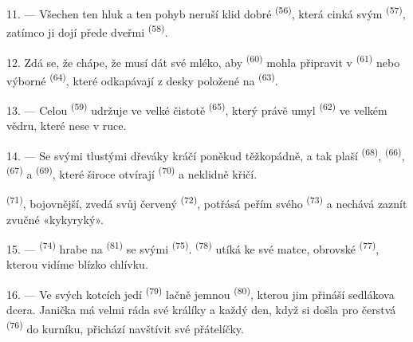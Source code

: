 11. --- Všechen ten hluk a ten pohyb neruší klid dobré 
\textsuperscript{(56)}, která cinká svým  \textsuperscript{(57)}, zatímco ji
dojí přede dveřmi  \textsuperscript{(58)}.

12. Zdá se, že chápe, že musí dát své mléko, aby  \textsuperscript{(60)} mohla
připravit  v  \textsuperscript{(61)} nebo výborné
 \textsuperscript{(64)}, které odkapávají z desky položené na 
\textsuperscript{(63)}.

13. --- Celou  \textsuperscript{(59)} udržuje ve velké čistotě
 \textsuperscript{(65)}, který právě umyl 
\textsuperscript{(62)} ve velkém vědru, které nese v ruce.

\VUsaut{3.0mm}
\VUsaut{3.0mm}

14. --- Se svými tlustými dřeváky kráčí poněkud těžkopádně, a tak plaší
 \textsuperscript{(68)},  \textsuperscript{(66)},
 \textsuperscript{(67)} a  \textsuperscript{(69)}, které
široce otvírají  \textsuperscript{(70)} a neklidně křičí.

 \textsuperscript{(71)}, bojovnější, zvedá svůj červený 
\textsuperscript{(72)}, potřásá peřím svého  \textsuperscript{(73)} a nechává
zaznít zvučné «kykyryký».

15. ---  \textsuperscript{(74)} hrabe na 
\textsuperscript{(81)} se svými  \textsuperscript{(75)}.
 \textsuperscript{(78)} utíká ke své matce, obrovské 
\textsuperscript{(77)}, kterou vidíme blízko chlívku.

16. --- Ve svých kotcích jedí  \textsuperscript{(79)} lačně jemnou
 \textsuperscript{(80)}, kterou jim přináší sedlákova dcera. Janička má
velmi ráda své králíky a každý den, když si došla pro čerstvá 
\textsuperscript{(76)} do kurníku, přichází navštívit své přátelíčky.
